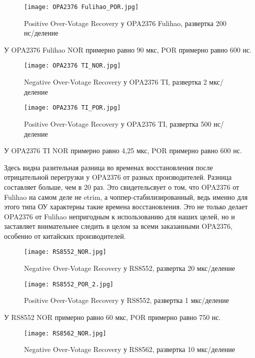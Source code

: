 \begin{figure}[H]
\centering
\texttt{[image: OPA2376 Fulihao\_POR.jpg]}
\caption{Positive Over-Votage Recovery у OPA2376 Fulihao, развертка 200 нс/деление}
\label{ris:418}
\end{figure}

У OPA2376 Fulihao NOR примерно равно 90 мкс,
POR примерно равно 600 нс.

\begin{figure}[H]
\centering
\texttt{[image: OPA2376 TI\_NOR.jpg]}
\caption{Negative Over-Votage Recovery у OPA2376 TI, развертка 2 мкс/деление}
\label{ris:419}
\end{figure}

\begin{figure}[H]
\centering
\texttt{[image: OPA2376 TI\_POR.jpg]}
\caption{Positive Over-Votage Recovery у OPA2376 TI, развертка 500 нс/деление}
\label{ris:420}
\end{figure}

У OPA2376 TI NOR примерно равно 4,25 мкс, 
POR примерно равно 600 нс. 

Здесь видна разительная разница во временах восстановления после отрицательной перегрузки у OPA2376 от 
разных производителей. Разница составляет больше, чем в 20 раз. Это свидетельсвует о том, что OPA2376 от 
Fulihao на самом деле не etrim, а чоппер-стабилизированный, ведь именно для этого типа ОУ характерны такие 
времена восстановления.
Это не только делает OPA2376 от Fulihao непригодным к использованию для наших целей, но и заставляет 
внимательнее следить в целом за всеми заказанными OPA2376, особенно от китайских производителей.

\begin{figure}[H]
\centering
\texttt{[image: RS8552\_NOR.jpg]}
\caption{Negative Over-Votage Recovery у RS8552, развертка 20 мкс/деление}
\label{ris:421}
\end{figure}

\begin{figure}[H]
\centering
\texttt{[image: RS8552\_POR\_2.jpg]}
\caption{Positive Over-Votage Recovery у RS8552, развертка 1 мкс/деление}
\label{ris:422}
\end{figure}

У RS8552 NOR примерно равно 60 мкс, 
POR примерно равно 750 нс.

\begin{figure}[H]
\centering
\texttt{[image: RS8562\_NOR.jpg]}
\caption{Negative Over-Votage Recovery у RS8562, развертка 10 мкс/деление}
\label{ris:423}
\end{figure}

